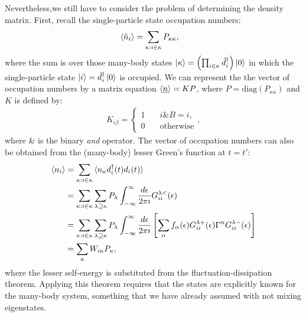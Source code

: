 \documentclass{article}
\begin{document}
\begin{multicols}{2}
        Nevertheless,we still have to consider the problem of determining the density matrix. First, recall the single-particle state occupation numbers:
        \begin{align*}
            \braket{\hat{n}_i} &= \sum_{\kappa: i\in \kappa} P_{\kappa\kappa},
        \end{align*}
        where the sum is over those many-body states $\ket{\kappa}=\left(\prod_{i\in\kappa}\hat{d}_i^\dagger \right)\ket{0}$ in which the single-particle state $\ket{i} = \hat{d}_i^\dagger \ket{0}$ is occupied. We can represent the the vector of occupation numbers by a matrix equation $\braket{\underline{n}} = KP$, where $P=\text{diag}(P_{\kappa\kappa})$ and $K$ is defined by:
        \begin{align}
            K_{i\beta} = \begin{cases} 1 & \quad i\&B=i, \\ 0 & \quad\text{otherwise}\end{cases},
        \label{eq:kmatrix}\end{align}
        where $\&$ is the binary \emph{and} operator. 
        The vector of occupation numbers can also be obtained from the (many-body) lesser Green's function at $t=t'$:
        \begin{align} 
            \braket{n_i} &= \sum_{\kappa: i \in \kappa} \braket{n_\kappa d_i^\dagger (t) d_i (t)} \nonumber\\ 
            &= \sum_{\kappa: i \in \kappa} \sum_{\lambda \supseteq \kappa} P_\lambda \int^\infty_{-\infty} \frac{d\epsilon}{2\pi\imath} G^{\lambda<}_{ii} (\epsilon) \nonumber\\
            &= \sum_{\kappa: i \in \kappa} \sum_{\lambda \supseteq \kappa} P_\lambda \int^\infty_{-\infty} \frac{d\epsilon}{2\pi\imath} \left[ \sum_\alpha f_\alpha(\epsilon) G^{\lambda+}_{ii} (\epsilon) \Gamma^\alpha G^{\lambda-}_{ii} (\epsilon)\right] \nonumber\\ 
            &= \sum_\kappa W_{i\kappa} P_\kappa, \label{eq:wmatrix}
        \end{align}
        where the lesser self-energy is substituted from the fluctuation-dissipation theorem. Applying this theorem requires that the states are explicitly known for the many-body system, something that we have already assumed with not mixing eigenstates.       
        

\end{multicols}
\end{document}
